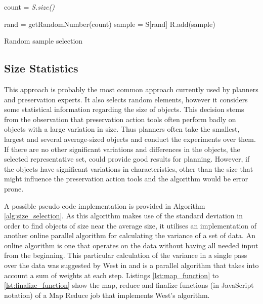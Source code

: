 \begin{algorithm}[!htb]

 \BlankLine

 count = \textit{S.size()}\; 
 
  {
   rand = getRandomNumber(count)\;
   sample = S[rand]\;
   R.add(sample)\; 
 }
 
 \caption{Random sample selection}
 \label{alg:random_selection}
\end{algorithm}

\subsection{Size Statistics}
This approach is probably the most common approach currently used by planners and preservation experts. It also selects random elements, however it considers some statistical information regarding the size of objects. This decision stems from the observation that preservation action tools often perform badly on objects with a large variation in size. Thus planners often take the smallest, largest and several average-sized objects and conduct the experiments over them. If there are no other significant variations and differences in the objects, the selected representative set, could provide good results for planning. However, if the objects have significant variations in characteristics, other than the size that might influence the preservation action tools and the algorithm would be error prone.

A possible pseudo code implementation is provided in Algorithm \ref{alg:size_selection}. As this algorithm makes use of the standard deviation in order to find objects of size near the average size, it utilises an implementation of another online parallel algorithm for calculating the variance of a set of data. An online algorithm is one that operates on the data without having all needed input from the beginning. This particular calculation of the variance in a single pass over the data was suggested by West in \cite{West:1979:UMV:359146.359153} and is a parallel algorithm that takes into account a sum of weights at each step. Listings \ref{lst:map_function} to \ref{lst:finalize_function} show the map, reduce and finalize functions (in JavaScript notation) of a Map Reduce job that implements West's algorithm.

